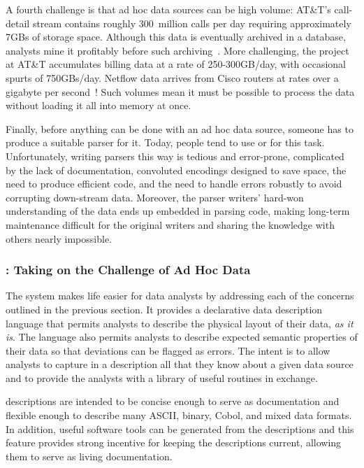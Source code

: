 \documentclass[11pt]{article}
\begin{document}
A fourth challenge is that ad hoc data sources can be high volume:
AT\&T's call-detail stream contains roughly 300~million calls per day
requiring approximately 7GBs of storage space. Although this data is
eventually archived in a database, analysts mine it profitably before
such archiving~\cite{kdd98,kdd99}. More challenging, the \ningaui{}
project at AT\&T accumulates billing data at a rate of 250-300GB/day,
with occasional spurts of 750GBs/day. Netflow data arrives from Cisco
routers at rates over a gigabyte per second~\cite{gigascope}! Such
volumes mean it must be possible to process the data without loading
it all into memory at once.

Finally, before anything can be done with an ad hoc data source,
someone has to produce a suitable parser for it.  Today, people tend
to use \C{} or \perl{} for this task.  Unfortunately, writing parsers
this way is tedious and error-prone, complicated by the lack of
documentation, convoluted encodings designed to save space, the need
to produce efficient code, and the need to handle errors robustly to
avoid corrupting down-stream data.  Moreover, the parser writers'
hard-won understanding of the data ends up embedded in parsing code,
making long-term maintenance difficult for the original writers and
sharing the knowledge with others nearly impossible.

\subsubsection{\pads{}:  Taking on the Challenge of Ad Hoc Data}

The \pads{} system makes life easier for data analysts by addressing
each of the concerns outlined in the previous section.
It provides a declarative data description
language that permits analysts to describe the physical layout of
their data, \textit{as it is}.  The language also permits analysts to
describe expected semantic properties of their data so that deviations can
be flagged as errors. The intent is to allow analysts to capture in a
\pads{} description all that they know about a given data source
and to provide the analysts with a library of useful routines in exchange. 


\pads{} descriptions are intended to be concise enough to serve as
documentation and flexible enough to describe many ASCII, binary,
Cobol, and mixed data formats.  In addition, useful software tools
can be generated from the descriptions and this feature provides
strong incentive for keeping the descriptions current, allowing them
to serve as living documentation.  
\end{document}
